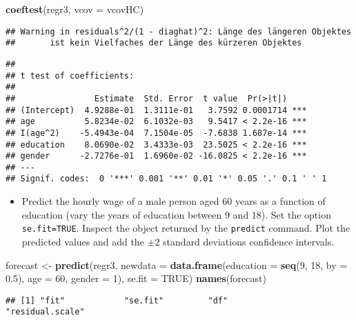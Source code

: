 \documentclass[]{article}
\newenvironment{Shaded}{\begin{snugshade}}{\end{snugshade}}
\newcommand{\KeywordTok}[1]{\textcolor[rgb]{0.13,0.29,0.53}{\textbf{#1}}}
\newcommand{\DataTypeTok}[1]{\textcolor[rgb]{0.13,0.29,0.53}{#1}}
\newcommand{\DecValTok}[1]{\textcolor[rgb]{0.00,0.00,0.81}{#1}}
\newcommand{\FloatTok}[1]{\textcolor[rgb]{0.00,0.00,0.81}{#1}}
\newcommand{\StringTok}[1]{\textcolor[rgb]{0.31,0.60,0.02}{#1}}
\newcommand{\OtherTok}[1]{\textcolor[rgb]{0.56,0.35,0.01}{#1}}
\newcommand{\NormalTok}[1]{#1}
\providecommand{\tightlist}{%
  \setlength{\itemsep}{0pt}\setlength{\parskip}{0pt}}
\begin{document}
\begin{Shaded}
\begin{Highlighting}[]
\KeywordTok{coeftest}\NormalTok{(regr3, }\DataTypeTok{vcov =}\NormalTok{ vcovHC)}
\end{Highlighting}
\end{Shaded}

\begin{verbatim}
## Warning in residuals^2/(1 - diaghat)^2: Länge des längeren Objektes
##       ist kein Vielfaches der Länge des kürzeren Objektes
\end{verbatim}

\begin{verbatim}
## 
## t test of coefficients:
## 
##                Estimate  Std. Error  t value  Pr(>|t|)    
## (Intercept)  4.9288e-01  1.3111e-01   3.7592 0.0001714 ***
## age          5.8234e-02  6.1032e-03   9.5417 < 2.2e-16 ***
## I(age^2)    -5.4943e-04  7.1504e-05  -7.6838 1.687e-14 ***
## education    8.0690e-02  3.4333e-03  23.5025 < 2.2e-16 ***
## gender      -2.7276e-01  1.6960e-02 -16.0825 < 2.2e-16 ***
## ---
## Signif. codes:  0 '***' 0.001 '**' 0.01 '*' 0.05 '.' 0.1 ' ' 1
\end{verbatim}

\begin{itemize}
\tightlist
\item
  Predict the hourly wage of a male person aged 60 years as a function
  of education (vary the years of education between 9 and 18). Set the
  option \texttt{se.fit=TRUE}. Inspect the object returned by the
  \texttt{predict} command. Plot the predicted values and add the
  \(\pm 2\) standard deviations confidence intervals.
\end{itemize}

\begin{Shaded}
\begin{Highlighting}[]
\NormalTok{forecast <-}\StringTok{ }\KeywordTok{predict}\NormalTok{(regr3, }\DataTypeTok{newdata =} \KeywordTok{data.frame}\NormalTok{(}\DataTypeTok{education =} \KeywordTok{seq}\NormalTok{(}\DecValTok{9}\NormalTok{, }\DecValTok{18}\NormalTok{, }\DataTypeTok{by =} \FloatTok{0.5}\NormalTok{), }\DataTypeTok{age =} \DecValTok{60}\NormalTok{, }\DataTypeTok{gender =} \DecValTok{1}\NormalTok{), }\DataTypeTok{se.fit =} \OtherTok{TRUE}\NormalTok{)}
\KeywordTok{names}\NormalTok{(forecast)}
\end{Highlighting}
\end{Shaded}

\begin{verbatim}
## [1] "fit"            "se.fit"         "df"             "residual.scale"
\end{verbatim}
\end{document}

